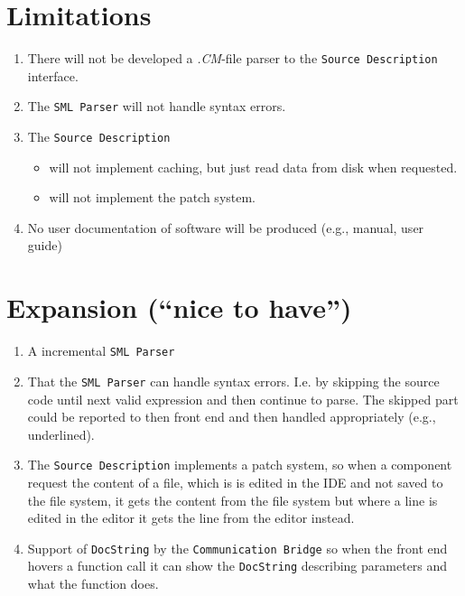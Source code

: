\documentclass[a4paper,oneside]{memoir}
\begin{document}
\section{Limitations}

\begin{enumerate}
\item There will not be developed a \textit{.CM}-file parser to the
  \texttt{Source Description} interface.

\item The \texttt{SML Parser} will not handle syntax errors. 

\item The \texttt{Source Description} 

  \begin{itemize}
  \item will not implement caching, but just read data from disk when requested.

  \item will not implement the patch system.
  \end{itemize}

\item No user documentation of software will be produced (e.g., manual, user guide)
\end{enumerate}


\section{Expansion (``nice to have'')}


\begin{enumerate}
\item A incremental \texttt{SML Parser}

\item That the \texttt{SML Parser} can handle syntax errors. I.e. by
  skipping the source code until next valid expression and then
  continue to parse. The skipped part could be reported to then front
  end and then handled appropriately (e.g., underlined).

\item The \texttt{Source Description} implements a patch system, so when a
  component request the content of  a file, which is is edited in the IDE and
  not saved to the file system, it gets the content from the file system but
  where a line is edited in the editor it gets the line from the editor instead.

\item Support of \texttt{DocString} by the \texttt{Communication
    Bridge} so when the front end hovers a function call it can show
  the \texttt{DocString} describing parameters and what the function
  does.

\end{enumerate}
\end{document}
